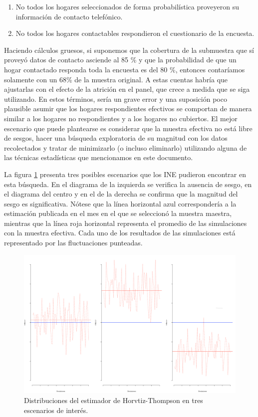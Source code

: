 \documentclass[
  12pt,
  spanish,
]{book}
\providecommand{\tightlist}{%
  \setlength{\itemsep}{0pt}\setlength{\parskip}{0pt}}
\begin{document}
\begin{enumerate}
\def\labelenumi{\arabic{enumi}.}
\tightlist
\item
  No todos los hogares seleccionados de forma probabilística proveyeron su información de contacto telefónico.
\item
  No todos los hogares contactables respondieron el cuestionario de la encuesta.
\end{enumerate}

Haciendo cálculos gruesos, si suponemos que la cobertura de la submuestra que sí proveyó datos de contacto asciende al 85 \% y que la probabilidad de que un hogar contactado responda toda la encuesta es del 80 \%, entonces contaríamos solamente con un 68\% de la muestra original. A estas cuentas habría que ajustarlas con el efecto de la atrición en el panel, que crece a medida que se siga utilizando. En estos términos, sería un grave error y una suposición poco plausible asumir que los hogares respondientes efectivos se comportan de manera similar a los hogares no respondientes y a los hogares no cubiertos. El mejor escenario que puede plantearse es considerar que la muestra efectiva no está libre de sesgos, hacer una búsqueda exploratoria de su magnitud con los datos recolectados y tratar de minimizarlo (o incluso eliminarlo) utilizando alguna de las técnicas estadísticas que mencionamos en este documento.

La figura \ref{fig:fight3dist} presenta tres posibles escenarios que los INE pudieron encontrar en esta búsqueda. En el diagrama de la izquierda se verifica la ausencia de sesgo, en el diagrama del centro y en el de la derecha se confirma que la magnitud del sesgo es significativa. Nótese que la línea horizontal azul correspondería a la estimación publicada en el mes en el que se seleccionó la muestra maestra, mientras que la línea roja horizontal representa el promedio de las simulaciones con la muestra efectiva. Cada uno de los resultados de las simulaciones está representado por las fluctuaciones punteadas.

\begin{figure}

{\centering \includegraphics[width=0.5\linewidth]{Pics/calnr1} 

}

\caption{Distribuciones del estimador de Horvtiz-Thompson en tres escenarios de interés.}\label{fig:fight3dist}
\end{figure}
\end{document}
